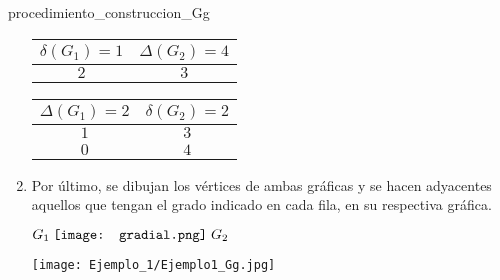 \documentclass[fleqn, 11pt]{beamer}
\newcommand{\gradial}{\hspace{0.9mm} \texttt{[image: gradial.png]} \hspace{1mm}}
\begin{document}
\begin{ejemplo}[breakable, pad at break = 4mm, beforeafter skip = 3mm]{}{procedimiento_construccion_Gg}
\begin{enumerate}[1.]
            \begin{center}
                \begin{minipage}[h]{0.3\linewidth}
                    \begin{tcolorbox}[title empty, center, colframe = black!99!white, colback = white, sharp corners, hbox, nobeforeafter, left = -0.9mm, right = -0.9mm, top = -0.9mm, bottom = -0.9mm]
                        \begin{tabular}{c|c}
                            \rowcolor{gray!36!white} 
                            $ \delta(G_1) = 1 $ & $ \Delta(G_2) = 4 $ \\ \hline\hline
                            $ 2 $               & $ 3 $ 
                        \end{tabular}
                    \end{tcolorbox}
                \end{minipage}
                \begin{minipage}[h]{0.3\linewidth}
                    \begin{tcolorbox}[title empty, center, colframe = black!99!white, colback = white, sharp corners, hbox, nobeforeafter, left = -0.9mm, right = -0.9mm, top = -0.9mm, bottom = -0.9mm]
                        \begin{tabular}{c|c}
                            \rowcolor{gray!36!white} 
                            $ \Delta(G_1) = 2 $ & $ \delta(G_2) = 2 $ \\ \hline\hline
                            $ 1 $               & $ 3 $ \\ \hline
                            $ 0 $               & $ 4 $
                        \end{tabular}
                    \end{tcolorbox}
                \end{minipage}
            \end{center} \vspace{3mm}

            \item Por último, se dibujan los vértices de ambas gráficas y se hacen adyacentes aquellos que tengan el grado indicado en cada fila, en su respectiva gráfica. \vspace{2mm}
            
            \begin{center}
                $ G_1 \gradial G_2 $

                \texttt{[image: Ejemplo\_1/Ejemplo1\_Gg.jpg]}
            \end{center}
        \end{enumerate}
    \end{ejemplo}
\end{document}
